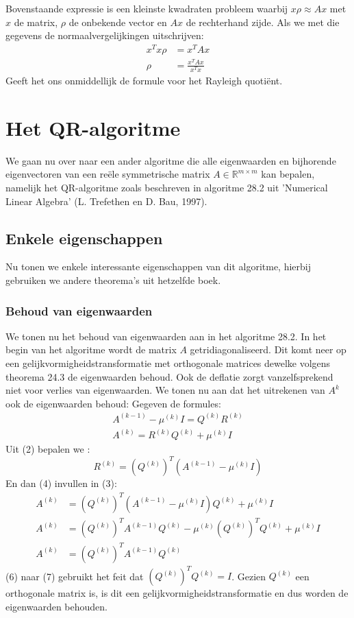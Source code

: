\documentclass[a4paper]{article}
\begin{document}
	\vspace{5 mm}
	\noindent Bovenstaande expressie is een kleinste kwadraten probleem waarbij $x\rho \approx Ax$ met $x$ de matrix, $\rho$ de onbekende vector en $Ax$ de rechterhand zijde. Als we met die gegevens de normaalvergelijkingen uitschrijven:
	\begin{align*}
		x^Tx  \rho &= x^TAx \\
		\rho &= \frac{x^TAx}{x^Tx}
	\end{align*}
	Geeft het ons onmiddellijk de formule voor het Rayleigh quotiënt.
\section{Het QR-algoritme}
	We gaan nu over naar een ander algoritme die alle eigenwaarden en bijhorende eigenvectoren van een reële symmetrische matrix $A \in \mathbb{R}^{m \times m}$ kan bepalen, namelijk het QR-algoritme zoals beschreven in algoritme 28.2 uit 'Numerical Linear Algebra' (L. Trefethen en D. Bau, 1997).
\subsection{Enkele eigenschappen}
	Nu tonen we enkele interessante eigenschappen van dit algoritme, hierbij gebruiken we andere theorema's uit hetzelfde boek.
\subsubsection{Behoud van eigenwaarden}
	We tonen nu het behoud van eigenwaarden aan in het algoritme 28.2.
	In het begin van het algoritme wordt de matrix $A$ getridiagonaliseerd. Dit komt neer op een gelijkvormigheidstransformatie met orthogonale matrices dewelke volgens theorema 24.3 de eigenwaarden behoud.
	Ook de deflatie zorgt vanzelfsprekend niet voor verlies van eigenwaarden.
	We tonen nu aan dat het uitrekenen van $A^{k}$ ook de eigenwaarden behoud:
	Gegeven de formules:
	\begin{gather}
		A^{(k-1)} - \mu ^{(k)}I = Q^{(k)}R^{(k)} \\
		A^{(k)} = R^{(k)}Q^{(k)} + \mu ^{(k)}I
	\end{gather}
	Uit (2) bepalen we :
	\begin{equation}
		R^{(k)} = (Q^{(k)})^T(A^{(k-1)}-\mu ^{(k)}I)		
	\end{equation}
	En dan (4) invullen in (3):
	\begin{align}
		A^{(k)} &= (Q^{(k)})^T(A^{(k-1)} - \mu ^{(k)}I)Q^{(k)} + \mu ^{(k)}I\\
		A^{(k)} &= (Q^{(k)})^TA^{(k-1)}Q^{(k)} - \mu ^{(k)}(Q^{(k)})^TQ^{(k)} + \mu ^{(k)}I\\
		A^{(k)} &= (Q^{(k)})^TA^{(k-1)}Q^{(k)}
	\end{align}
	(6) naar (7) gebruikt het feit dat $(Q^{(k)})^TQ^{(k)} = I$.
	Gezien $Q^{(k)}$ een orthogonale matrix is, is dit een gelijkvormigheidstransformatie en dus worden de eigenwaarden behouden.
	
\end{document}
